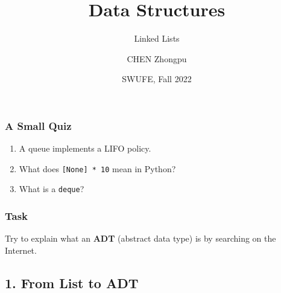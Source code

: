\documentclass[aspectratio=169, 14pt]{beamer}
\title[Data Structures] %
{Data Structures}
\subtitle{Linked Lists}
\author[CHEN Zhongpu] %
{CHEN Zhongpu}
\institute[] %
{
  School of Computing and Artificial Intelligence \\
  \href{mailto:zpchen@swufe.edu.cn}{zpchen@swufe.edu.cn}
}
\date[] %
{SWUFE, Fall 2022}
\begin{document}
\frame{\titlepage}

\begin{frame}
\frametitle{A Small Quiz}
\begin{enumerate}
    \item A queue implements a LIFO policy.
    \item What does \texttt{[None] * 10} mean in Python?
    \item What is a \texttt{deque}?
\end{enumerate}
\end{frame}

\begin{frame}
    \frametitle{Task}
Try to explain what an \textbf{ADT} (abstract data type) is by searching on the Internet.
    

\end{frame}

{
    \begin{frame}
        \section{\textcolor{darkmidnightblue}{1. From List to ADT}}
    \end{frame}

}
\end{document}
